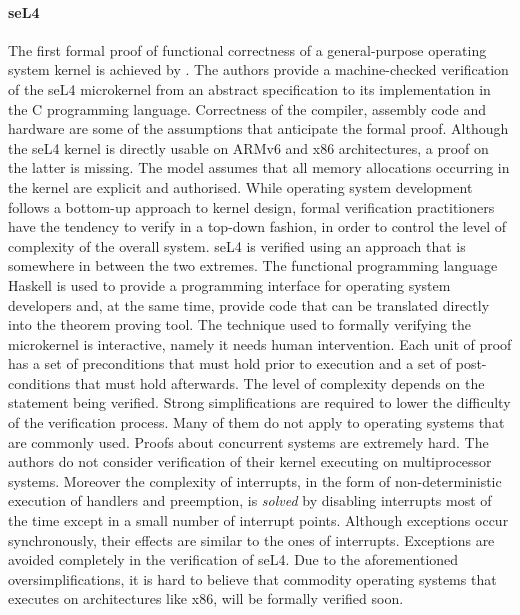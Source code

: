 \paragraph{seL4}
The first formal proof of functional correctness of a general-purpose operating system kernel is achieved by \cite{sel4}. The authors provide a machine-checked verification of the seL4 microkernel from an abstract specification to its implementation in the C programming language.
Correctness of the compiler, assembly code and hardware are some of the assumptions that anticipate the formal proof. Although the seL4 kernel is directly usable on ARMv6 and x86 architectures, a proof on the latter is missing. The model assumes that all memory allocations occurring in the kernel are explicit and authorised.
While operating system development follows a bottom-up approach to kernel design, formal verification practitioners have the tendency to verify in a top-down fashion, in order to control the level of complexity of the overall system. seL4 is verified using an approach that is somewhere in between the two extremes. The functional programming language Haskell is used to provide a programming interface for operating system developers and, at the same time, provide code that can be translated directly into the theorem proving tool.
The technique used to formally verifying the microkernel is interactive, namely it needs human intervention.
Each unit of proof has a set of preconditions that must hold prior to execution and a set of post-conditions that must hold afterwards. The level of complexity depends on the statement being verified. Strong simplifications are required to lower the difficulty of the verification process. Many of them do not apply to operating systems that are commonly used.
Proofs about concurrent systems are extremely hard. The authors do not consider verification of their kernel executing on multiprocessor systems. Moreover the complexity of interrupts, in the form of non-deterministic execution of handlers and preemption, is \emph{solved} by disabling interrupts most of the time except in a small number of interrupt points. Although exceptions occur synchronously, their effects are similar to the ones of interrupts. Exceptions are avoided completely in the verification of seL4. 
Due to the aforementioned oversimplifications, it is hard to believe that commodity operating systems that  executes on architectures like x86, will be formally verified soon.
   


